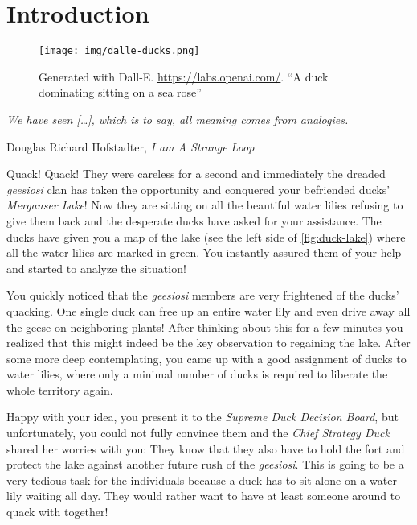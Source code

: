 \chapter{Introduction}\label{ch:introduction}

\vspace*{-50pt}

\begin{figure}[ht]
        \texttt{[image: img/dalle-ducks.png]}
        \captionsetup{textformat=empty,labelformat=blank}
        \caption{Generated with Dall-E. \url{https://labs.openai.com/}. ``A duck dominating sitting on a sea rose''}
\end{figure}

\epigraph{\itshape We have seen [\ldots], which is to say, all meaning comes from analogies.}{Douglas Richard Hofstadter, \textit{I am A Strange Loop}}

Quack! Quack! They were careless for a second and immediately the dreaded \textit{geesiosi} clan has taken the opportunity and conquered your befriended ducks' \textit{Merganser Lake}!
Now they are sitting on all the beautiful water lilies refusing to give them back and the desperate ducks have asked for your assistance.
The ducks have given you a map of the lake (see the left side of \cref{fig:duck-lake}) where all the water lilies are marked in green.
You instantly assured them of your help and started to analyze the situation!

You quickly noticed that the \textit{geesiosi} members are very frightened of the ducks' quacking. 
One single duck can free up an entire water lily and even drive away all the geese on neighboring plants! After thinking about this for a few minutes you realized that this might indeed be the key observation to regaining the lake. 
After some more deep contemplating, you came up with a good assignment of ducks to water lilies, where only a minimal number of ducks is required to liberate the whole territory again.

Happy with your idea, you present it to the \textit{Supreme Duck Decision Board}, but unfortunately, you could not fully convince them and the \textit{Chief Strategy Duck} shared her worries with you: 
They know that they also have to hold the fort and protect the lake against another future rush of the \textit{geesiosi}.
This is going to be a very tedious task for the individuals because a duck has to sit alone on a water lily waiting all day. They would rather want to have at least someone around to quack with together!

